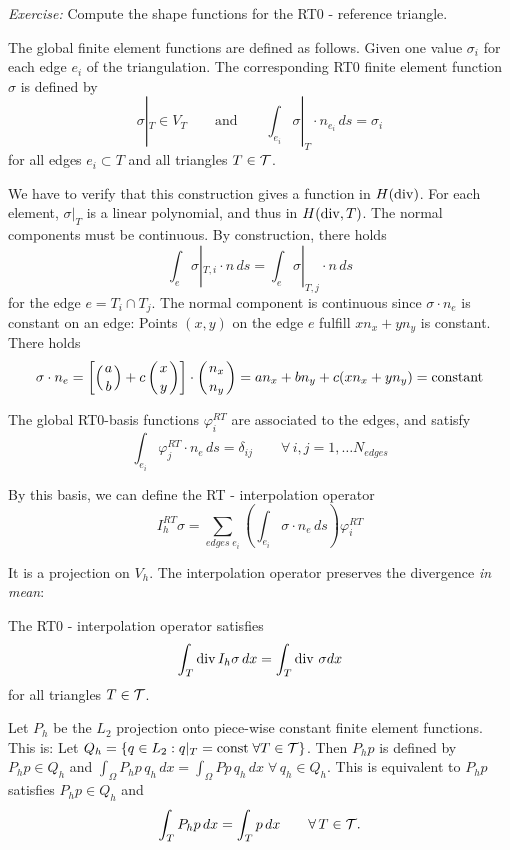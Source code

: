 {\em Exercise: } Compute the shape functions for the RT0 - reference triangle.

\bigskip

The global finite element functions are defined as follows. Given one 
value $\sigma_i$
for each edge $e_i$ of the triangulation. The corresponding RT0 finite element
function $\sigma$ is defined by
$$
\sigma |_T \in V_T \qquad \mbox{and} \qquad \int_{e_i} \sigma|_{T} \cdot n_{e_i} \, ds = \sigma_i
$$
for all edges $e_i \subset T$ and all triangles $T \in {\cal T}$. 


\bigskip

We have to verify that this construction gives a function in $H(\operatorname{div})$. For
each element, $\sigma|_T$ is a linear polynomial, and thus in $H(\operatorname{div}, T)$. The normal
components must be continuous. By construction, there holds
$$
\int_e \sigma|_{T,i} \cdot n \, ds =
\int_e \sigma|_{T,j} \cdot n \, ds 
$$
for the edge $e = T_i \cap T_j$. The normal component is continuous since 
$\sigma \cdot n_e$ is constant on an edge: Points $(x,y)$ on the edge $e$ fulfill
$x n_x + y n_y$ is constant. There holds
$$
\sigma \cdot n_e = \left[ \left( a \atop b \right) + c \left( x \atop y \right) \right]
\cdot \left( n_x \atop n_y \right) =
a n_x + b n_y + c (x n_x + y n_y) = \mbox{constant}
$$

\bigskip

The global RT0-basis functions $\varphi_i^{RT}$ are associated to the edges,
and satisfy
$$
\int_{e_i} \varphi_j^{RT} \cdot n_e \, ds = \delta_{ij} \qquad 
\forall \, i,j = 1, \ldots N_{edges}
$$

By this basis, we can define the RT - interpolation operator
$$
I_h^{RT} \sigma = \sum_{edges \; e_i} \left( \int_{e_i} \sigma \cdot n_e \, ds \right) 
\varphi_i^{RT}
$$

It is a projection on $V_h$. The interpolation operator preserves the
divergence {\em in mean}:

\begin{lemma} \label{lemma_commute}
The RT0 - interpolation operator satisfies
$$
\int_T \operatorname{div} I_h \sigma \, dx = \int_T \operatorname{div} \, \sigma dx
$$
for all triangles $T \in {\cal T}$.
\end{lemma}


Let $P_h$ be the $L_2$ projection onto piece-wise constant finite
element functions. This is: Let $Q_h = \{ q \in L_2 : q |_T = \mbox{const} \; \forall T \in {\cal T} \}$. Then $P_h p$ is defined by $P_h p \in Q_h$ and
$\int_\Omega P_h p \, q_h \, dx = \int_\Omega P p \, q_h \, dx \; \forall \, q_h \in Q_h$. 
This is equivalent to $P_h p$ satisfies $P_h p \in Q_h$ and
$$
\int_T P_h p \, dx = \int_T p \, dx \qquad \forall \, T \in {\cal T}.
$$ 

